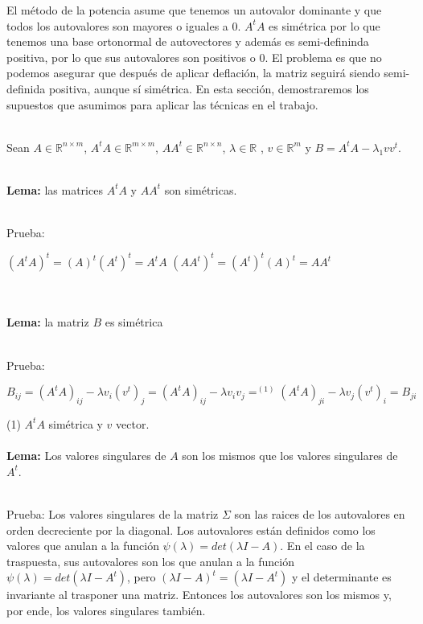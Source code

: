 El método de la potencia asume que tenemos un autovalor dominante y que todos los autovalores son
mayores o iguales a 0. $A^t A$ es simétrica por lo que tenemos una base ortonormal de autovectores
y además es semi-defininda positiva, por lo que sus autovalores son positivos o 0. El problema es
que no podemos asegurar que después de aplicar deflación, la matriz seguirá siendo semi-definida
positiva, aunque sí simétrica. En esta sección, demostraremos los supuestos que asumimos para
aplicar las técnicas en el trabajo.



\ \\

Sean $A \in \mathbb{R}^{n \times m}$, $A^t A \in \mathbb{R}^{m \times m}$, $A A^t \in \mathbb{R}^{n \times n}$, $\lambda \in \mathbb{R}$
, $v \in \mathbb{R}^m$ y $B = A^t A - \lambda_{1} v v^t$.

\ \\
\textbf{Lema:} las matrices $A^t A$ y $A A^t$ son simétricas.

\ \\
Prueba:

\begin{center}
  $(A^t A)^t = (A)^t (A^t)^t = A^t A$
  $(A A^t)^t = (A^t)^t (A)^t = A A^t$
\end{center}
\ \\

\ \\
\textbf{Lema:} la matriz $B$ es simétrica

\ \\
Prueba:

\begin{center}
  $B_{ij} = (A^t A)_{ij} - \lambda v_i (v^t)_j = (A^t A)_{ij} - \lambda v_i v_j =^{(1)} (A^t A)_{ji}
  - \lambda v_j (v^t)_i = B_{ji}$
\end{center}

(1) $A^t A$ simétrica y $v$ vector.
\ \\


\ \\
\textbf{Lema:} Los valores singulares de $A$ son los mismos que los valores singulares de $A^t$.

\ \\
Prueba: Los valores singulares de la matriz $\Sigma$ son las raices de los autovalores en orden
decreciente por la diagonal. Los autovalores están definidos como los valores que anulan a la
función
$\psi(\lambda) = det(\lambda I - A)$. En el caso de la traspuesta, sus autovalores son los que
anulan a la función $\psi(\lambda) = det(\lambda I - A^t)$, pero $(\lambda I - A)^t = (\lambda I -
A^t)$ y el determinante es invariante al trasponer una matriz. Entonces los autovalores son los
mismos y, por ende, los valores singulares también.


